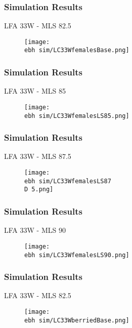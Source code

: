\documentclass{beamer}
\newcommand{\ebh}{\string~/bio.data/bio.lobster/figures/LFA2733Framework2018/} %
\newcommand{\D}{.}
\begin{document}
\begin{frame}
\frametitle{Simulation Results}
LFA 33W - MLS 82.5
\begin{figure}
        \begin{center}
            \texttt{[image: \\ebh sim/LC33WfemalesBase.png]}
        \end{center}
    \end{figure}
\end{frame}



\begin{frame}
\frametitle{Simulation Results}
LFA 33W - MLS 85
\begin{figure}
        \begin{center}
            \texttt{[image: \\ebh sim/LC33WfemalesLS85.png]}
        \end{center}
    \end{figure}
\end{frame}


\begin{frame}
\frametitle{Simulation Results}
LFA 33W - MLS 87.5
\begin{figure}
        \begin{center}
            \texttt{[image: \\ebh sim/LC33WfemalesLS87\\D 5.png]}
        \end{center}
    \end{figure}
\end{frame}


\begin{frame}
\frametitle{Simulation Results}
LFA 33W - MLS 90
\begin{figure}
        \begin{center}
            \texttt{[image: \\ebh sim/LC33WfemalesLS90.png]}
        \end{center}
    \end{figure}
\end{frame}





\begin{frame}
\frametitle{Simulation Results}
LFA 33W - MLS 82.5
\begin{figure}
        \begin{center}
            \texttt{[image: \\ebh sim/LC33WberriedBase.png]}
        \end{center}
    \end{figure}
\end{frame}
\end{document}
